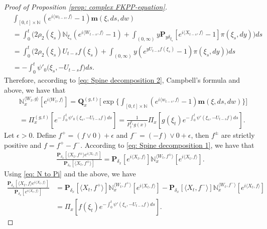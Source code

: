 \documentclass[12pt,a4paper]{amsart}
\theoremstyle{plain}
\theoremstyle{definition}
\numberwithin{equation}{section}
\begin{document}
\begin{proof}[Proof of Proposition \ref{prop: complex FKPP-equation}]
  \begin{align}
    & \int_{[0,t]\times \mathbb N}(e^{i \langle w_{t-s}, f\rangle} - 1) \mathbf m(\xi, ds,dw)
    \\ & =\int_0^t \Big(2\rho_2(\xi_s)\mathbb N_{\xi_s}(e^{i \langle W_{t-s}, f\rangle} - 1)  + \int_{(0,\infty)} y \mathbf P_{y \delta_{\xi_s}}[e^{i \langle X_{t-s}, f\rangle} - 1] \pi(\xi_s,dy)\Big) ds
    \\ & =\int_0^t \Big( 2\rho_2(\xi_s) U_{t-s} f(\xi_s) + \int_{(0,\infty)} y (e^{y U_{t-s}f(\xi_s)} - 1) \pi(\xi_s,dy) \Big) ds
    \\ & = -\int_0^t \psi'_0 \big(\xi_s, -U_{t-s}f\big)ds.
  \end{align}
  Therefore, according to \eqref{eq: Spine decomposition 2}, Campbell's formula and above, we have that
  \begin{align}
    \label{eq: N to Pi}
    & \mathbb N_x^{\langle W_{t}, g\rangle}[e^{i \langle W_t, f\rangle}]
      = \mathbf Q_x^{(g,t)} \Big[\exp\Big\{\int_{[0,t]\times \mathbb N}(e^{i \langle w_{t-s}, f\rangle} - 1) \mathbf m(\xi, ds,dw)\Big\}\Big]
    \\ & = \Pi_x^{(g,t)} [e^{-\int_0^t \psi'_0(\xi_s, -U_{t-s}f)ds}]
    = \frac{1}{P_t^{\rho_1} g (x)} \Pi_x[ g(\xi_t) e^{-\int_0^t \psi'(\xi_s, -U_{t-s}f)ds} ].
  \end{align}
  Let $\epsilon >0$.
  Define $f^+ = (f \vee 0) + \epsilon$ and $f^- = (-f) \vee 0 + \epsilon$, then $f^\pm$ are strictly positive and $f = f^+ - f^-$.
  According to \eqref{eq: Spine decomposition 1}, we have that
  \begin{align}
    \frac{\mathbf P_{\delta_x}[\langle X_t,f^{\pm}\rangle e^{i \langle X_t,f\rangle}]}{\mathbf P_{\delta_x}[\langle X_t,f^{\pm}\rangle ]}
    = \mathbf P_{\delta_x}[e^{i \langle X_t,f\rangle}] \mathbb N_x^{\langle W_t,f^{\pm}\rangle}[e^{i \langle X_t,f\rangle}].
  \end{align}
  Using \eqref{eq: N to Pi} and the above, we have
  \begin{align}
    \frac{\mathbf P_{\delta_x}[\langle X_t, f\rangle e^{i \langle X_t, f\rangle}] }{\mathbf P_{\delta_x}[e^{i \langle X_t, f\rangle}]}
    & = \mathbf P_{\delta_x}[\langle X_t, f^+\rangle] \mathbb N_x^{\langle W_t, f^+\rangle} [e^{i \langle X_t, f\rangle}] - \mathbf P_{\delta_x}[\langle X_t, f^-\rangle]\mathbb N_x^{\langle W_t, f^-\rangle}[e^{i \langle X_t, f\rangle}]
    \\ & = \Pi_x[ f(\xi_t) e^{- \int_0^t \psi'(\xi_s, -U_{t-s}f) ds}  ].
  \end{align}

\end{proof}
\end{document}
